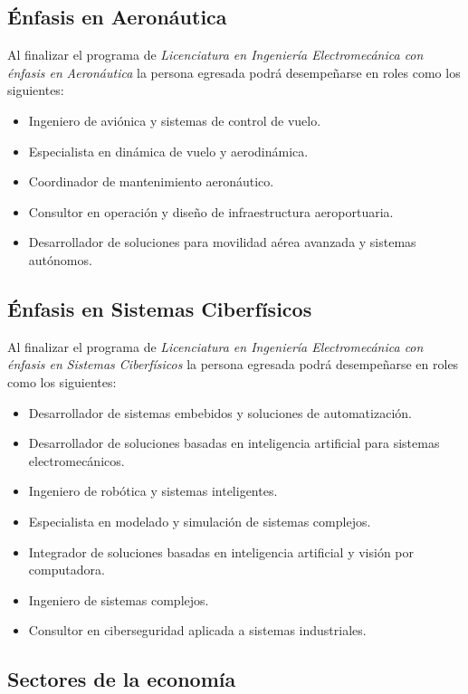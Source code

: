 \subsection*{Énfasis en Aeronáutica}

Al finalizar el programa de \textit{Licenciatura en Ingeniería Electromecánica con énfasis en }\textit{Aero}\textit{náutica}\textit{ }la persona egresada podrá desempeñarse en roles como los siguientes:\par

\begin{itemize}
\item Ingeniero de aviónica y sistemas de control de vuelo.
\item Especialista en dinámica de vuelo y aerodinámica.
\item Coordinador de mantenimiento aeronáutico.
\item Consultor en operación y diseño de infraestructura aeroportuaria.
\item Desarrollador de soluciones para movilidad aérea avanzada y sistemas autónomos.
\end{itemize}
\subsection*{Énfasis en Sistemas Ciberfísicos}

Al finalizar el programa de \textit{Licenciatura en Ingeniería Electromecánica con énfasis en }\textit{Sistemas Ciberfísicos }la persona egresada podrá desempeñarse en roles como los siguientes:\par

\begin{itemize}
\item Desarrollador de sistemas embebidos y soluciones de automatización.
\item Desarrollador de soluciones basadas en inteligencia artificial para sistemas electromecánicos.
\item Ingeniero de robótica y sistemas inteligentes.
\item Especialista en modelado y simulación de sistemas complejos.
\item Integrador de soluciones basadas en inteligencia artificial y visión por computadora.
\item Ingeniero de sistemas complejos.
\item Consultor en ciberseguridad aplicada a sistemas industriales.
\end{itemize}
\subsection*{Sectores de la economía}

